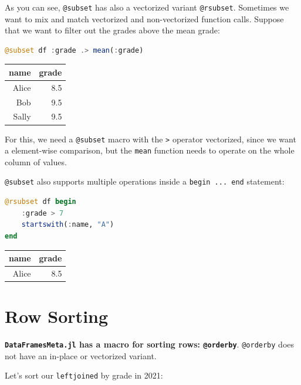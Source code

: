 \documentclass[
  notoc %
]{tufte-book}
\newcommand{\passthrough}[1]{#1}
\begin{document}
As you can see, \passthrough{\lstinline!@subset!} has also a vectorized
variant \passthrough{\lstinline!@rsubset!}. Sometimes we want to mix and
match vectorized and non-vectorized function calls. Suppose that we want
to filter out the grades above the mean grade:

\begin{lstlisting}[language=Julia]
@subset df :grade .> mean(:grade)
\end{lstlisting}

\begin{longtable}[]{@{}rr@{}}
\toprule
name & grade \\
\midrule
\endhead
Alice & 8.5 \\
Bob & 9.5 \\
Sally & 9.5 \\
\bottomrule
\end{longtable}

For this, we need a \passthrough{\lstinline!@subset!} macro with the
\passthrough{\lstinline!>!} operator vectorized, since we want a
element-wise comparison, but the \passthrough{\lstinline!mean!} function
needs to operate on the whole column of values.

\passthrough{\lstinline!@subset!} also supports multiple operations
inside a \passthrough{\lstinline!begin ... end!} statement:

\begin{lstlisting}[language=Julia]
@rsubset df begin
    :grade > 7
    startswith(:name, "A")
end
\end{lstlisting}

\begin{longtable}[]{@{}rr@{}}
\toprule
name & grade \\
\midrule
\endhead
Alice & 8.5 \\
\bottomrule
\end{longtable}

\hypertarget{sec:dataframesmeta_orderby}{%
\section{Row Sorting}\label{sec:dataframesmeta_orderby}}

\textbf{\passthrough{\lstinline!DataFramesMeta.jl!} has a macro for
sorting rows: \passthrough{\lstinline!@orderby!}}.
\passthrough{\lstinline!@orderby!} does not have an in-place or
vectorized variant.

Let's sort our \passthrough{\lstinline!leftjoined!} by grade in 2021:
\end{document}

